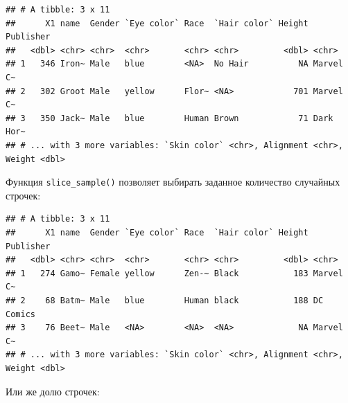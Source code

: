 \documentclass[
]{book}
\newenvironment{Shaded}{\begin{snugshade}}{\end{snugshade}}
\newcommand{\DataTypeTok}[1]{\textcolor[rgb]{0.13,0.29,0.53}{#1}}
\newcommand{\DecValTok}[1]{\textcolor[rgb]{0.00,0.00,0.81}{#1}}
\newcommand{\FloatTok}[1]{\textcolor[rgb]{0.00,0.00,0.81}{#1}}
\newcommand{\KeywordTok}[1]{\textcolor[rgb]{0.13,0.29,0.53}{\textbf{#1}}}
\newcommand{\NormalTok}[1]{#1}
\newcommand{\OperatorTok}[1]{\textcolor[rgb]{0.81,0.36,0.00}{\textbf{#1}}}
\newcommand{\StringTok}[1]{\textcolor[rgb]{0.31,0.60,0.02}{#1}}
\begin{document}
\begin{Shaded}
\end{Shaded}

\begin{verbatim}
## # A tibble: 3 x 11
##      X1 name  Gender `Eye color` Race  `Hair color` Height Publisher
##   <dbl> <chr> <chr>  <chr>       <chr> <chr>         <dbl> <chr>    
## 1   346 Iron~ Male   blue        <NA>  No Hair          NA Marvel C~
## 2   302 Groot Male   yellow      Flor~ <NA>            701 Marvel C~
## 3   350 Jack~ Male   blue        Human Brown            71 Dark Hor~
## # ... with 3 more variables: `Skin color` <chr>, Alignment <chr>, Weight <dbl>
\end{verbatim}

Функция \texttt{slice\_sample()} позволяет выбирать заданное количество случайных строчек:

\begin{Shaded}
\end{Shaded}

\begin{verbatim}
## # A tibble: 3 x 11
##      X1 name  Gender `Eye color` Race  `Hair color` Height Publisher
##   <dbl> <chr> <chr>  <chr>       <chr> <chr>         <dbl> <chr>    
## 1   274 Gamo~ Female yellow      Zen-~ Black           183 Marvel C~
## 2    68 Batm~ Male   blue        Human black           188 DC Comics
## 3    76 Beet~ Male   <NA>        <NA>  <NA>             NA Marvel C~
## # ... with 3 more variables: `Skin color` <chr>, Alignment <chr>, Weight <dbl>
\end{verbatim}

Или же долю строчек:

\begin{Shaded}
\end{Shaded}
\end{document}
